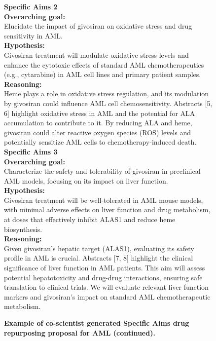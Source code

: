 \begin{figure}[htbp!]
\caption{\textbf{Example of co-scientist generated Specific Aims drug repurposing proposal for AML (continued).}}
\label{fig:aim1_2}
\vspace{0.1cm}
\begin{tcolorbox}[title=Givosiran for AML (continued)]
\footnotesize
\textbf{Specific Aims 2}\\
\textbf{Overarching goal:}\\
Elucidate the impact of givosiran on oxidative stress and drug sensitivity in AML.\\
\textbf{Hypothesis:}\\
Givosiran treatment will modulate oxidative stress levels and enhance the cytotoxic effects of standard AML chemotherapeutics (e.g., cytarabine) in AML cell lines and primary patient samples.\\
\textbf{Reasoning:}\\
Heme plays a role in oxidative stress regulation, and its modulation by givosiran could influence AML cell chemosensitivity.  Abstracts [5, 6] highlight oxidative stress in AML and the potential for ALA accumulation to contribute to it. By reducing ALA and heme, givosiran could alter reactive oxygen species (ROS) levels and potentially sensitize AML cells to chemotherapy-induced death.\\

\textbf{Specific Aims 3}\\
\textbf{Overarching goal:}\\
Characterize the safety and tolerability of givosiran in preclinical AML models, focusing on its impact on liver function.\\
\textbf{Hypothesis:}\\
Givosiran treatment will be well-tolerated in AML mouse models, with minimal adverse effects on liver function and drug metabolism, at doses that effectively inhibit ALAS1 and reduce heme biosynthesis.\\
\textbf{Reasoning:}\\
Given givosiran's hepatic target (ALAS1), evaluating its safety profile in AML is crucial. Abstracts [7, 8] highlight the clinical significance of liver function in AML patients. This aim will assess potential hepatotoxicity and drug-drug interactions, ensuring safe translation to clinical trials. We will evaluate relevant liver function markers and givosiran's impact on standard AML chemotherapeutic metabolism.\\


\end{tcolorbox}
\end{figure}
